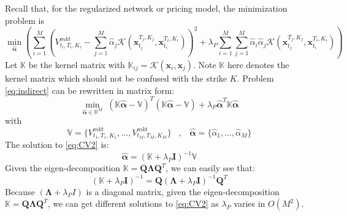 \documentclass[letterpaper,12pt,titlepage,oneside,final]{book}
\numberwithin{equation}{section}
\theoremstyle{definition}
\newcommand{\vx}{\mathbf{x}}
\newcommand{\Real}{\mathbb{R}}
\newcommand{\valpha}{\pmb{\widehat{\alpha}}}
\newcommand{\vK}{\mathbb{K}}
\newcommand{\Vmkt}{V^{mkt}}
\newcommand{\vecVmkt}{\mathbb{V}}
\begin{document}
Recall that, for the regularized network or pricing model, the minimization problem is
\[
\min_{\mathbf{\valpha}} \left(  \sum_{i=1}^M \left( \Vmkt_{t_i,T_i,K_i}-\sum_{j=1}^M \widehat{\alpha}_j \mathcal{K}(\vx_{t_j}^{T_j,K_j},\vx_{t_i}^{T_i,K_i}) \right)^2+\lambda_P \sum_{i=1}^M\sum_{j=1}^M  \widehat{\alpha}_i \widehat{\alpha}_j \mathcal{K}(\vx_{t_j}^{T_j,K_j},\vx_{t_i}^{T_i,K_i})\right)
 \]
Let $\vK$ be the kernel matrix with $\vK_{ij}=\mathcal{K}(\mathbf{x}_i,\mathbf{x}_j)$. Note $\vK$ here denotes the kernel matrix which should not be confused with the strike $K$. Problem \eqref{eq:indirect} can be rewritten in matrix form:
\begin{equation}
\min_{\valpha \in \Real^M} \; ( \vK \valpha - \vecVmkt)^T ( \vK \valpha -\vecVmkt)+ \lambda_P \valpha^T\vK\valpha
\label{eq:CV2}
\end{equation}
with
\[
	\vecVmkt=\{
	\Vmkt_{t_1,T_1,K_1},\dots,	\Vmkt_{t_M,T_M,K_M}
	\}	\;\;\;,\;\;\; \valpha=\{\widehat{\alpha}_1,\dots,\widehat{\alpha}_M\}
\]
The solution to \eqref{eq:CV2} is:
\[
\valpha  =(\vK+\lambda_P \pmb{I})^{-1}\vecVmkt
\]
Given the eigen-decomposition $\vK=\pmb{Q} \pmb{\Lambda} \pmb{Q}^T$, we can easily see that:
\begin{equation}\label{eq:eig}
(\vK+\lambda_P \pmb{I})^{-1}=\pmb{Q}(\pmb{\Lambda}+\lambda_P \pmb{I})^{-1} \pmb{Q}^T
\end{equation}
Because $(\pmb{\Lambda}+\lambda_P I)$ is a diagonal matrix, given the eigen-decomposition $\vK=\pmb{Q} \pmb{\Lambda} \pmb{Q}^T$, we can get different solutions to \eqref{eq:CV2}  as $\lambda_P$ varies in $O(M^2)$.
\end{document}
